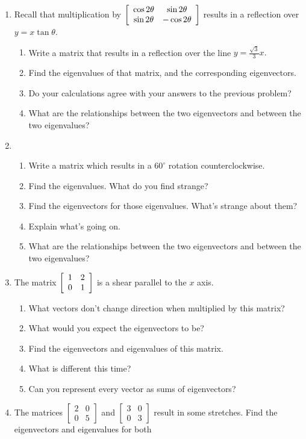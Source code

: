 \documentclass[../gatm.tex]{subfiles}
\begin{document}
\begin{enumerate}
\begin{enumerate}
\end{enumerate}
\item Recall that multiplication by $\left[\begin{array}{cc} \cos 2\theta & \sin 2\theta \\ \sin 2\theta & -\cos 2\theta \end{array}\right]$ results in a reflection over $y=x\tan \theta$.
\begin{enumerate}
\item Write a matrix that results in a reflection over the line $y=\frac{\sqrt{3}}{3}x.$
\item Find the eigenvalues of that matrix, and the corresponding eigenvectors.
\item Do your calculations agree with your answers to the previous problem?
\item What are the relationships between the two eigenvectors and between the two eigenvalues?
\end{enumerate}
\item \begin{enumerate}
\item Write a matrix which results in a $60^\circ$ rotation counterclockwise.
\item Find the eigenvalues. What do you find strange?
\item Find the eigenvectors for those eigenvalues. What's strange about them?
\item Explain what's going on.
\item What are the relationships between the two eigenvectors and between the two eigenvalues?
\end{enumerate}
\item The matrix $\left[\begin{array}{cc} 1 & 2 \\ 0 & 1 \end{array}\right]$ is a shear parallel to the $x$ axis.
\begin{enumerate}
\item What vectors don't change direction when multiplied by this matrix?
\item What would you expect the eigenvectors to be?
\item Find the eigenvectors and eigenvalues of this matrix.
\item What is different this time?
\item Can you represent every vector as sums of eigenvectors?
\end{enumerate}
\item The matrices $\left[\begin{smallmatrix} 2 & 0 \\ 0 & 5 \end{smallmatrix}\right]$ and $\left[\begin{smallmatrix} 3 & 0 \\ 0 & 3 \end{smallmatrix}\right]$ result in some stretches. Find the eigenvectors and eigenvalues for both

\end{enumerate}
\end{document}
